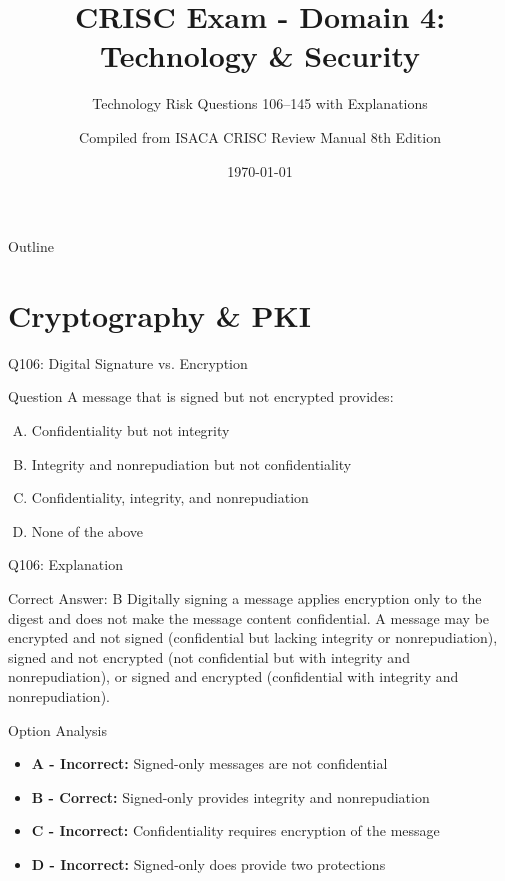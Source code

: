 \documentclass{beamer}
\title{CRISC Exam - Domain 4: Technology \& Security}
\subtitle{Technology Risk Questions 106--145 with Explanations}
\author{Compiled from ISACA CRISC Review Manual 8th Edition}
\date{\today}
\begin{document}
	
	\begin{frame}
		\titlepage
	\end{frame}
	
	\begin{frame}{Outline}
		\tableofcontents
	\end{frame}
	
	
	\section{Cryptography \& PKI}
	
	\begin{frame}{Q106: Digital Signature vs. Encryption}
		\begin{block}{Question}
			A message that is signed but not encrypted provides:
		\end{block}
		\begin{enumerate}[(A)]
			\item Confidentiality but not integrity
			\item Integrity and nonrepudiation but not confidentiality
			\item Confidentiality, integrity, and nonrepudiation
			\item None of the above
		\end{enumerate}
	\end{frame}
	
	\begin{frame}{Q106: Explanation}
		\begin{block}{Correct Answer: B}
			Digitally signing a message applies encryption only to the digest and does not make the message content confidential. A message may be encrypted and not signed (confidential but lacking integrity or nonrepudiation), signed and not encrypted (not confidential but with integrity and nonrepudiation), or signed and encrypted (confidential with integrity and nonrepudiation).
		\end{block}
		\begin{block}{Option Analysis}
			\begin{itemize}
				\item \textbf{A - Incorrect:} Signed-only messages are not confidential
				\item \textbf{B - Correct:} Signed-only provides integrity and nonrepudiation
				\item \textbf{C - Incorrect:} Confidentiality requires encryption of the message
				\item \textbf{D - Incorrect:} Signed-only does provide two protections
			\end{itemize}
		\end{block}
	\end{frame}
	
\end{document}
